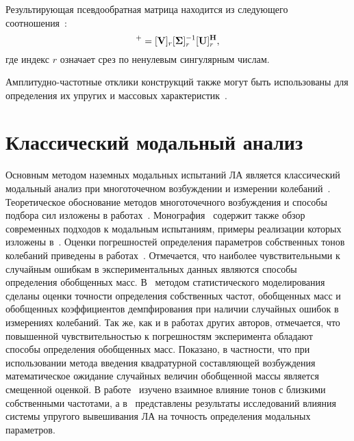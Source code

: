 Результирующая псевдообратная матрица находится из следующего соотношения~\cite{lib:coupling:Gialamas2001}:
\begin{equation}
	[\mat{G}]^{+} = [\mat{V}]_r [\mat{\Sigma}]_r ^ {-1} [\mat{U}]_r ^ \mat{H},
\end{equation}
где индекс $ r $ означает срез по ненулевым сингулярным числам.

Амплитудно-частотные отклики конструкций также могут быть использованы для определения их упругих и массовых характеристик~\cite{lib:coupling:Almeida, lib:coupling:Xi, lib:coupling:Malekjafarian}.

\section{Классический модальный анализ}

Основным методом наземных модальных испытаний ЛА является классический модальный анализ при многоточечном возбуждении и измерении колебаний~\cite{lib:ema:Karklje:GVT}. Теоретическое обоснование методов многоточечного возбуждения и способы подбора сил изложены в работах~\cite{lib:ema:Dat, lib:ema:Dat&Tretout&Lafont, lib:ema:Mikishev, lib:ema:Smyslov, lib:ema:Heilen, lib:ema:Berns:identification}. Монография~\cite{lib:ema:Heilen} содержит также обзор современных подходов к модальным испытаниям, примеры реализации которых изложены в~\cite{lib:ema:Boswald, lib:ema:Brillhart, lib:ema:Peres, lib:ema:Peter, lib:ema:Pickrel}. Оценки погрешностей определения параметров собственных тонов колебаний приведены в работах~\cite{lib:ema:Smyslov, lib:ema:Vasiliev, lib:ema:Zharov, lib:ema:Ushkalov}. Отмечается, что наиболее чувствительными к случайным ошибкам в экспериментальных данных являются способы определения обобщенных масс. В~\cite{lib:ema:Berns:estimate} методом статистического моделирования сделаны оценки точности определения собственных частот, обобщенных масс и обобщенных коэффициентов демпфирования при наличии случайных ошибок в измерениях колебаний. Так же, как и в работах других авторов, отмечается, что повышенной чувствительностью к погрешностям эксперимента обладают способы определения обобщенных масс. Показано, в частности, что при использовании метода введения квадратурной составляющей возбуждения математическое ожидание случайных величин обобщенной массы является смещенной оценкой. В работе~\cite{lib:ema:Berns:errors} изучено взаимное влияние тонов с близкими собственными частотами, а в~\cite{lib:ema:Berns:support} представлены результаты исследований влияния системы упругого вывешивания ЛА на точность определения модальных параметров. 

